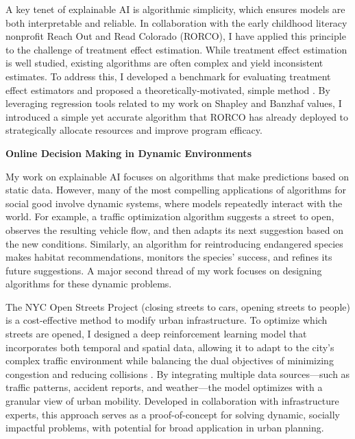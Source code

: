 \documentclass[11pt]{article}
\begin{document}
{A key tenet of explainable AI is algorithmic simplicity, which ensures models are both interpretable and reliable. In collaboration with the early childhood literacy nonprofit Reach Out and Read Colorado (RORCO), I have applied this principle to the challenge of treatment effect estimation. While treatment effect estimation is well studied, existing algorithms are often complex and yield inconsistent estimates. To address this, I developed a benchmark for evaluating treatment effect estimators and proposed a theoretically-motivated, simple method \cite{witter2024benchmarking}. By leveraging regression tools related to my work on Shapley and Banzhaf values, I introduced a simple yet accurate algorithm that RORCO has already deployed to strategically allocate resources and improve program efficacy.

\begin{center}
{\large \textbf{Online Decision Making in Dynamic Environments}}
\end{center}

My work on explainable AI focuses on algorithms that make predictions based on static data. However, many of the most compelling applications of algorithms for social good involve dynamic systems, where models repeatedly interact with the world. For example, a traffic optimization algorithm suggests a street to open, observes the resulting vehicle flow, and then adapts its next suggestion based on the new conditions. Similarly, an algorithm for reintroducing endangered species makes habitat recommendations, monitors the species’ success, and refines its future suggestions. A major second thread of my work focuses on designing algorithms for these dynamic problems.

The NYC Open Streets Project (closing streets to cars, opening streets to people) is a cost-effective method to modify urban infrastructure. To optimize which streets are opened, I designed a deep reinforcement learning model that incorporates both temporal and spatial data, allowing it to adapt to the city's complex traffic environment while balancing the dual objectives of minimizing congestion and reducing collisions \cite{witter2024i}. By integrating multiple data sources—such as traffic patterns, accident reports, and weather—the model optimizes with a granular view of urban mobility. Developed in collaboration with infrastructure experts, this approach serves as a proof-of-concept for solving dynamic, socially impactful problems, with potential for broad application in urban planning.

}
\end{document}
